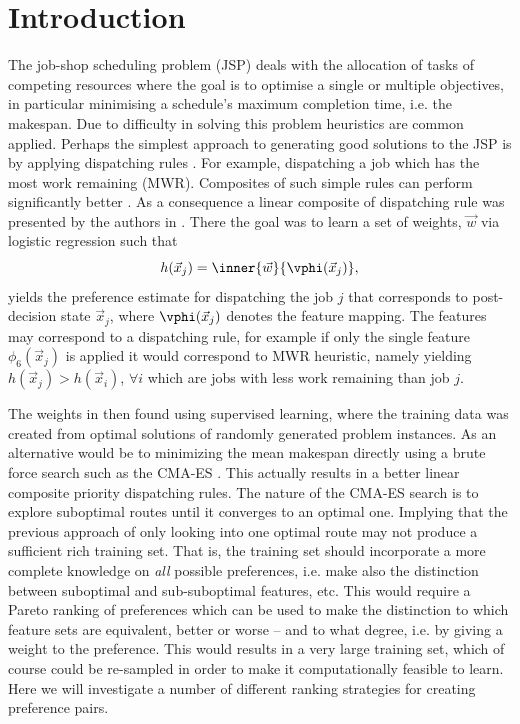 \documentclass{svjour3}                     %
\begin{document}
\section{Introduction}
The job-shop scheduling problem (JSP) deals with the allocation of tasks of competing resources where the goal is to optimise a single or multiple objectives, in particular minimising a schedule's maximum completion time, i.e. the makespan. Due to difficulty in solving this problem heuristics are common applied. Perhaps the simplest approach to generating good solutions to the JSP is by applying dispatching rules \cite{Panwalkar77}. For example, dispatching a job which has the most work remaining (MWR). Composites of such simple rules can perform significantly better 
\cite{Jayamohan04}. As a consequence a linear composite of dispatching rule was presented by the authors in 
\cite{InRu11a}. There the goal was to learn a set of weights, $\vec{w}$ via logistic regression such that 
\begin{equation}\label{eq:jssp:linweights}
h(\vec{x}_j)=\inner{\vec{w}}{\vphi(\vec{x}_j)},
\end{equation}
yields the preference estimate for dispatching the job $j$ that corresponds to post-decision state $\vec{x}_j$, where $\vphi(\vec{x}_j)$ denotes the feature mapping. 
The features may correspond to a dispatching rule, for example if only the single feature $\phi_6(\vec{x}_j) $ is applied it would correspond to MWR heuristic, namely yielding $h(\vec{x}_j)>h(\vec{x}_i)$, $\forall i$ which are jobs with less work remaining than job $j$. 

The weights in \cite{InRu11a} then found using supervised learning, where the training data was created from optimal solutions of randomly generated problem instances. As an alternative would be to minimizing the mean makespan directly using a brute force search such as the CMA-ES \cite{Hansen01}. This actually results in a better linear composite priority dispatching rules. The nature of the CMA-ES search is to explore suboptimal routes until it converges to an optimal one. Implying that the previous approach of only looking into one optimal route may not produce a sufficient rich training set. That is, the training set should incorporate a more complete knowledge on \emph{all} possible preferences, i.e. make also the distinction between suboptimal and sub-suboptimal features, etc.  This would require a Pareto ranking of preferences which can be used to make the distinction to which feature sets are equivalent, better or worse -- and to what degree, i.e. by giving a weight to the preference. This would results in a very large training set, which of course could be re-sampled in order to make it computationally feasible to learn. Here we will investigate a number of different ranking strategies for creating preference pairs.
\end{document}
